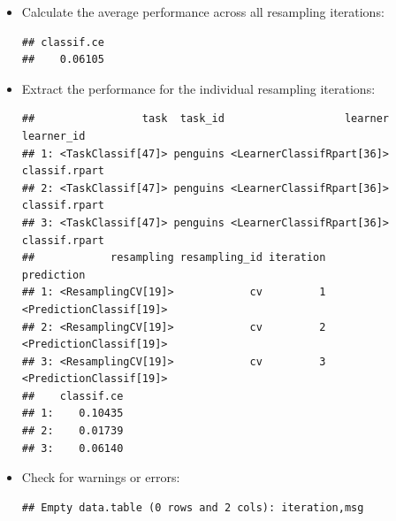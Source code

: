 \documentclass[
]{scrbook}
\newenvironment{Shaded}{\begin{snugshade}}{\end{snugshade}}
\newcommand{\FunctionTok}[1]{\textcolor[rgb]{0.00,0.00,0.00}{#1}}
\newcommand{\NormalTok}[1]{#1}
\newcommand{\SpecialCharTok}[1]{\textcolor[rgb]{0.00,0.00,0.00}{#1}}
\newcommand{\StringTok}[1]{\textcolor[rgb]{0.31,0.60,0.02}{#1}}
\renewenvironment{Shaded} {\begin{snugshade}\small} {\end{snugshade}}
\begin{document}
\begin{itemize}
\item
  Calculate the average performance across all resampling iterations:

\begin{Shaded}
\end{Shaded}

\begin{verbatim}
## classif.ce 
##    0.06105
\end{verbatim}
\item
  Extract the performance for the individual resampling iterations:

\begin{Shaded}
\end{Shaded}

\begin{verbatim}
##                 task  task_id                   learner    learner_id
## 1: <TaskClassif[47]> penguins <LearnerClassifRpart[36]> classif.rpart
## 2: <TaskClassif[47]> penguins <LearnerClassifRpart[36]> classif.rpart
## 3: <TaskClassif[47]> penguins <LearnerClassifRpart[36]> classif.rpart
##            resampling resampling_id iteration              prediction
## 1: <ResamplingCV[19]>            cv         1 <PredictionClassif[19]>
## 2: <ResamplingCV[19]>            cv         2 <PredictionClassif[19]>
## 3: <ResamplingCV[19]>            cv         3 <PredictionClassif[19]>
##    classif.ce
## 1:    0.10435
## 2:    0.01739
## 3:    0.06140
\end{verbatim}
\item
  Check for warnings or errors:

\begin{Shaded}
\end{Shaded}

\begin{verbatim}
## Empty data.table (0 rows and 2 cols): iteration,msg
\end{verbatim}


\end{itemize}
\end{document}
